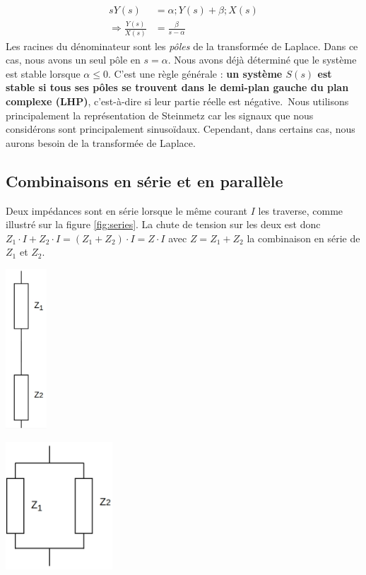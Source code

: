 \begin{align*}
	s Y(s) &= \alpha ; Y(s) + \beta ; X(s) \\
	\Rightarrow \frac{Y(s)}{X(s)} &= \frac{\beta}{s - \alpha}
\end{align*}
Les racines du dénominateur sont les \emph{pôles} de la transformée de Laplace. Dans ce cas, nous avons un seul pôle en $s = \alpha$. Nous avons déjà déterminé que le système est stable lorsque $\alpha \le 0$. C'est une règle générale : \textbf{un système $S(s)$ est stable si tous ses pôles se trouvent dans le demi-plan gauche du plan complexe (LHP)}, c'est-à-dire si leur partie réelle est négative.\
Nous utilisons principalement la représentation de Steinmetz car les signaux que nous considérons sont principalement sinusoïdaux. Cependant, dans certains cas, nous aurons besoin de la transformée de Laplace.

\subsection{Combinaisons en série et en parallèle}

Deux impédances sont en série lorsque le même courant $I$ les traverse, comme illustré sur la figure \ref{fig:series}. La chute de tension sur les deux est donc $Z_1 \cdot I + Z_2 \cdot I = (Z_1 + Z_2) \cdot I = Z \cdot I$ avec $Z = Z_1 + Z_2$ la combinaison en série de $Z_1$ et $Z_2$.

\begin{minipage}{.5\textwidth}
	\centering
	\includegraphics[height=6cm]{figures/ch00/series.jpg}
	\label{fig:series}
\end{minipage}
\begin{minipage}{.5\textwidth}
	\centering
	\includegraphics[width=4cm]{figures/ch00/parallel.jpg}
	\label{fig:parallel}
\end{minipage}%

